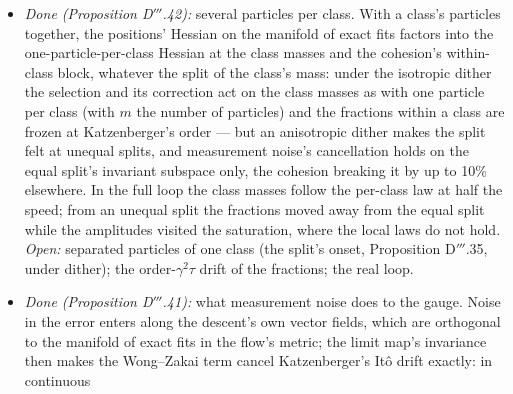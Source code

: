 \begin{enumerate}[label=\arabic*.,leftmargin=*]
\begin{itemize}
      Markov noise, a concave penalty for every colour in the continuum. A sparse exact fit on fewer than $N$ atoms is
      held by the slow selection once the correlation time passes a threshold that grows with the dictionary's
      coherence, by the white one only where weighted basis pursuit recovers it. The slow selection recovered the sparse
      truth where basis pursuit fails (its reduced flow on $10\times40$ Gaussian designs 0.75 and 0.60 of the 3- and
      4-sparse truths against basis pursuit's 0.38 and 0.17, on Gaussian kernel dictionaries 1.00 against 0.85), and
      label-noise descent at small $\sigma$ identified the support where its reduced flow does (four of eight
      instances; the coefficients after a noiseless phase); sparse Bayesian learning matches or beats it (0.88 and
      0.55): the contribution is the mechanism. The replicator's own masses: Proposition D$'''$.44. \emph{Open:} the
      descent's pruning phase (fewer than $N$ atoms alive, $\lambda_{\min}(K)\to0$); the basins; noise that reaches the
      adaptation through a closed loop.
    \item \emph{Done (Proposition D$'''$.42):} several particles per class. With a class's particles together, the
      positions' Hessian on the manifold of exact fits factors into the one-particle-per-class Hessian at the class
      masses and the cohesion's within-class block, whatever the split of the class's mass: under the isotropic dither
      the selection and its correction act on the class masses as with one particle per class (with $m$ the number of
      particles) and the fractions within a class are frozen at Katzenberger's order --- but an anisotropic dither makes
      the split felt at unequal splits, and measurement noise's cancellation holds on the equal split's invariant
      subspace only, the cohesion breaking it by up to 10\% elsewhere. In the full loop the class masses follow the
      per-class law at half the speed; from an unequal split the fractions moved away from the equal split while the
      amplitudes visited the saturation, where the local laws do not hold. \emph{Open:} separated particles of one
      class (the split's onset, Proposition D$'''$.35, under dither); the order-$\gamma^2\tau$ drift of the fractions;
      the real loop.
    \item \emph{Done (Proposition D$'''$.41):} what measurement noise does to the gauge. Noise in the error enters along
      the descent's own vector fields, which are orthogonal to the manifold of exact fits in the flow's metric; the
      limit map's invariance then makes the Wong--Zakai term cancel Katzenberger's It\^o drift exactly: in continuous

\end{itemize}
\end{enumerate}
